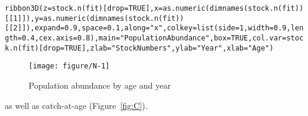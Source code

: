 \documentclass[a4paper,english,10pt]{article}\usepackage[]{graphicx}\usepackage[]{color}
\makeatletter
\def\maxwidth{ %
  \ifdim\Gin@nat@width>\linewidth
    \linewidth
  \else
    \Gin@nat@width
  \fi
}
\newcommand{\hlnum}[1]{\textcolor[rgb]{0.2,0.2,0.2}{#1}}%
\newcommand{\hlstr}[1]{\textcolor[rgb]{0.2,0.2,0.2}{#1}}%
\newcommand{\hlstd}[1]{\textcolor[rgb]{0,0,0}{#1}}%
\newcommand{\hlkwc}[1]{\textcolor[rgb]{0.361,0.506,0.596}{#1}}%
\newcommand{\hlkwd}[1]{\textcolor[rgb]{0.361,0.506,0.596}{#1}}%
\newenvironment{kframe}{%
 \def\at@end@of@kframe{}%
 \ifinner\ifhmode%
  \def\at@end@of@kframe{\end{minipage}}%
  \begin{minipage}{\columnwidth}%
 \fi\fi%
 \def\FrameCommand##1{\hskip\@totalleftmargin \hskip-\fboxsep
 \colorbox{shadecolor}{##1}\hskip-\fboxsep
     \hskip-\linewidth \hskip-\@totalleftmargin \hskip\columnwidth}%
 \MakeFramed {\advance\hsize-\width
   \@totalleftmargin\z@ \linewidth\hsize
   \@setminipage}}%
 {\par\unskip\endMakeFramed%
 \at@end@of@kframe}
\newenvironment{knitrout}{}{} %
\makeatother
\begin{document}
\begin{knitrout}
\color{fgcolor}\begin{kframe}
\begin{alltt}
\hlkwd{ribbon3D}\hlstd{(} \hlkwc{z} \hlstd{=} \hlkwd{stock.n}\hlstd{(fit)[}\hlkwc{drop}\hlstd{=}\hlnum{TRUE}\hlstd{],} \hlkwc{x}\hlstd{=} \hlkwd{as.numeric}\hlstd{(}\hlkwd{dimnames}\hlstd{(}\hlkwd{stock.n}\hlstd{(fit))[[}\hlnum{1}\hlstd{]]),} \hlkwc{y}\hlstd{=} \hlkwd{as.numeric}\hlstd{(}\hlkwd{dimnames}\hlstd{(}\hlkwd{stock.n}\hlstd{(fit))[[}\hlnum{2}\hlstd{]]) ,} \hlkwc{expand} \hlstd{=} \hlnum{0.9}\hlstd{,} \hlkwc{space} \hlstd{=} \hlnum{0.1}\hlstd{,} \hlkwc{along} \hlstd{=} \hlstr{"x"}\hlstd{,} \hlkwc{colkey} \hlstd{=} \hlkwd{list}\hlstd{(} \hlkwc{side}\hlstd{=}\hlnum{1}\hlstd{,} \hlkwc{width} \hlstd{=} \hlnum{0.9}\hlstd{,} \hlkwc{length} \hlstd{=} \hlnum{0.4}\hlstd{,} \hlkwc{cex.axis} \hlstd{=} \hlnum{0.8}\hlstd{),} \hlkwc{main}\hlstd{=}\hlstr{"Population Abundance"} \hlstd{,} \hlkwc{box} \hlstd{=} \hlnum{TRUE}\hlstd{,} \hlkwc{col.var}\hlstd{=}\hlkwd{stock.n}\hlstd{(fit)[}\hlkwc{drop}\hlstd{=}\hlnum{TRUE}\hlstd{],}   \hlkwc{zlab}\hlstd{=}\hlstr{"Stock Numbers"}\hlstd{,} \hlkwc{ylab}\hlstd{=}\hlstr{"Year"}\hlstd{,} \hlkwc{xlab}\hlstd{=}\hlstr{"Age"}\hlstd{)}
\end{alltt}
\end{kframe}\begin{figure}[H]

{\centering \texttt{[image: figure/N-1]} 

}

\caption[Population abundance by age and year]{Population abundance by age and year\label{fig:N}}
\end{figure}


\end{knitrout}

as well as catch-at-age (Figure~\ref{fig:C}).
\end{document}
